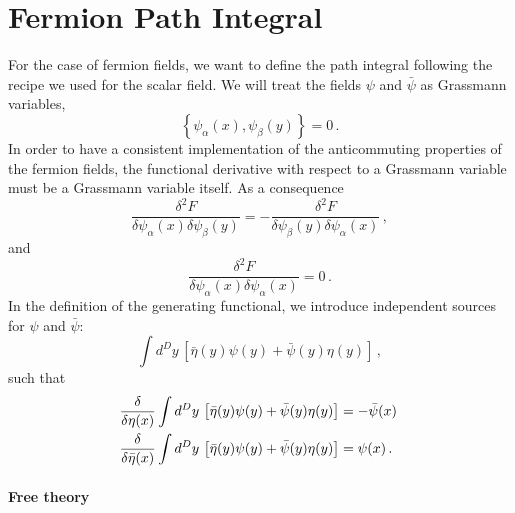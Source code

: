 
\section{Fermion Path Integral}
\label{sec:ferm-path-integr}

For the case of fermion fields, we want to define the path integral
following the recipe we used for the scalar field. We will treat the
fields $\psi$ and $\bar\psi$ as Grassmann variables, \ie 
\begin{equation}
  \label{eq:GrassVar}
  \left\{\psi_\alpha(x),\psi_\beta(y)\right\}=0\, .
\end{equation}
In order to have a consistent implementation of the anticommuting
properties of the fermion fields, the functional derivative with
respect to a Grassmann variable must be a Grassmann variable
itself. As a consequence
\begin{equation}
  \label{eq:GrassDer}
  \frac{\delta^2 F}{\delta \psi_\alpha(x) \delta\psi_\beta(y)} = 
  -\frac{\delta^2 F}{\delta \psi _\beta(y) \delta\psi_\alpha(x)}\, ,
\end{equation}
and 
\begin{equation}
  \label{eq:GrassDer2}
    \frac{\delta^2 F}{\delta \psi_\alpha(x) \delta\psi_\alpha(x)} = 0\,.
\end{equation}
In the definition of the generating functional, we introduce
independent sources for $\psi$ and $\bar{\psi}$:
\begin{equation}
  \label{eq:SourceTerm}
  \int d^Dy\, \left[
    \bar{\eta}(y) \psi(y) + \bar{\psi}(y) \eta(y)
    \right]\, ,
\end{equation}
such that
\begin{align}
  \label{eq:GrassDerivOne}
  \frac{\delta}{\delta\eta(x)} &\int d^Dy\, \left[
    \bar{\eta}(y) \psi(y) + \bar{\psi}(y) \eta(y)
    \right] = - \bar{\psi}(x)\, \\
  \label{eq:GrassDerivOne}
  \frac{\delta}{\delta\bar{\eta}(x)} &\int d^Dy\, \left[
    \bar{\eta}(y) \psi(y) + \bar{\psi}(y) \eta(y)
    \right] = \psi(x)\, .
\end{align}

\paragraph{Free theory}

